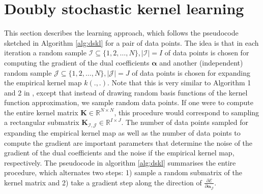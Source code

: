 \documentclass{article} %
\newcommand{\R}{\ensuremath{\mathds{R}}}
\newcommand{\va}{\boldsymbol{\alpha}}
\renewcommand{\vec}[1]{\mathbf{#1}}
\begin{document}
\section{Doubly stochastic kernel learning}\label{sec:dskl}
This section describes the learning approach, which follows the pseudocode sketched in Algorithm \autoref{alg:dskl} for a pair of data points. The idea is that in each iteration a random sample $\mathcal{I}\subseteq\{1,2,\dots,N\}, |\mathcal{I}|=I$ of data points is chosen for computing the gradient of the dual coefficients $\va$ and another (independent) random sample  $\mathcal{J}\subseteq\{1,2,\dots,N\}, |\mathcal{J}|=J$ of data points is chosen for expanding the empirical kernel map $k(.,.)$. Note that this is very similar to Algorithm 1 and 2 in \cite{Dai2014}, except that instead of drawing random basis functions of the kernel function approximation, we sample random data points. If one were to compute the entire kernel matrix $\vec{K}\in\R^{N\times N}$, this procedure would correspond to sampling a rectangular submatrix $\vec{K}_{\mathcal{I,J}}\in\R^{I\times J}$. The number of data points sampled for expanding the empirical kernel map as well as the number of data points to compute the gradient are important parameters that determine the noise of the gradient of the dual coefficients and the noise if the empirical kernel map, respectively. The pseudocode in algorithm \autoref{alg:dskl} summarises the entire procedure, which alternates two steps: 1) sample a random submatrix of the kernel matrix and 2) take a gradient step along the direction of $\frac{\partial\mathcal{E}}{\partial \va_{\mathcal{J}}}$.
\end{document}
